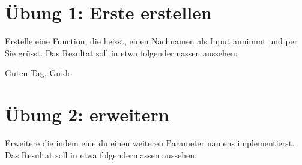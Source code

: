 \documentclass[letterpaper,10pt,english]{sphinxmanual}
\begin{document}
\section{Übung 1: Erste  erstellen}
\label{\detokenize{02_03_Functions:ubung-1-erste-function-erstellen}}
Erstelle eine Function, die  heisst, einen Nachnamen als Input annimmt und per Sie grüsst. Das Resultat soll in etwa folgendermassen aussehen:

\begin{sphinxVerbatim}[commandchars=\\\{\}]
 
\end{sphinxVerbatim}

\begin{sphinxVerbatim}[commandchars=\\\{\}]
\end{sphinxVerbatim}

\begin{sphinxVerbatim}[commandchars=\\\{\}]
\PYGZsq{}Guten Tag, Guido\PYGZsq{}
\end{sphinxVerbatim}


\section{Übung 2:  erweitern}
\label{\detokenize{02_03_Functions:ubung-2-function-erweitern}}
Erweitere die   indem eine du einen weiteren Parameter namens  implementierst. Das Resultat soll in etwa folgendermassen aussehen:

\begin{sphinxVerbatim}[commandchars=\\\{\}]
  
\end{sphinxVerbatim}
\end{document}
